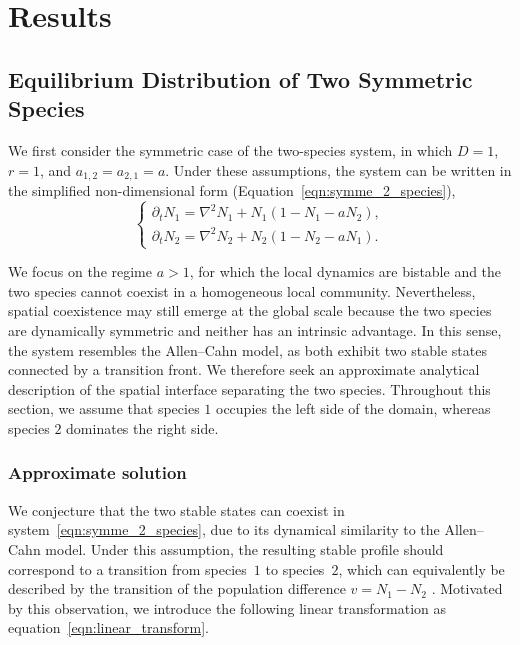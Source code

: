 \section{Results}

\subsection{Equilibrium Distribution of Two Symmetric Species}

We first consider the symmetric case of the two-species system, in which $D = 1$, $r = 1$, and $a_{1,2} = a_{2,1} = a$. Under these assumptions, the system can be written in the simplified non-dimensional form (Equation~\ref{eqn:symme_2_species}),
\begin{equation*}
    \begin{cases}
        \partial_t N_{1} = \nabla^2 N_1 + N_1(1 - N_1 - a N_2),\\
        \partial_t N_{2} = \nabla^2 N_2 + N_2(1 - N_2 - a N_1).
    \end{cases}
\end{equation*}

We focus on the regime $a > 1$, for which the local dynamics are bistable and the two species cannot coexist in a homogeneous local community. Nevertheless, spatial coexistence may still emerge at the global scale because the two species are dynamically symmetric and neither has an intrinsic advantage. In this sense, the system resembles the Allen--Cahn model, as both exhibit two stable states connected by a transition front. We therefore seek an approximate analytical description of the spatial interface separating the two species. Throughout this section, we assume that species $1$ occupies the left side of the domain, whereas species $2$ dominates the right side.

\subsubsection{Approximate solution}

We conjecture that the two stable states can coexist in system~\ref{eqn:symme_2_species}, due to its dynamical similarity to the Allen--Cahn model. Under this assumption, the resulting stable profile should correspond to a transition from species~$1$ to species~$2$, which can equivalently be described by the transition of the population difference $v = N_1 - N_2$
. Motivated by this observation, we introduce the following linear transformation as equation~\ref{eqn:linear_transform}.

